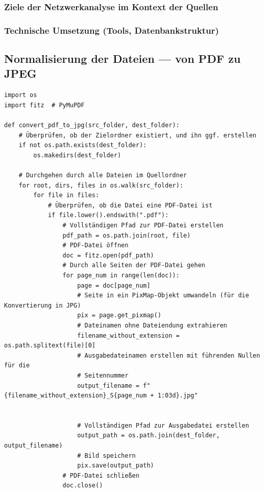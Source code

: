 \documentclass[12pt, a4paper, ngerman, bidi=default]{article}
\begin{document}
        \subsubsection{Ziele der Netzwerkanalyse im Kontext der Quellen}
        \subsubsection{Technische Umsetzung (Tools, Datenbankstruktur)}

\subsection{Normalisierung der Dateien --- von PDF zu JPEG}
\begin{verbatim}
import os
import fitz  # PyMuPDF

def convert_pdf_to_jpg(src_folder, dest_folder):
    # Überprüfen, ob der Zielordner existiert, und ihn ggf. erstellen
    if not os.path.exists(dest_folder):
        os.makedirs(dest_folder)

    # Durchgehen durch alle Dateien im Quellordner
    for root, dirs, files in os.walk(src_folder):
        for file in files:
            # Überprüfen, ob die Datei eine PDF-Datei ist
            if file.lower().endswith(".pdf"):
                # Vollständigen Pfad zur PDF-Datei erstellen
                pdf_path = os.path.join(root, file)
                # PDF-Datei öffnen
                doc = fitz.open(pdf_path)
                # Durch alle Seiten der PDF-Datei gehen
                for page_num in range(len(doc)):
                    page = doc[page_num]
                    # Seite in ein PixMap-Objekt umwandeln (für die Konvertierung in JPG)
                    pix = page.get_pixmap()
                    # Dateinamen ohne Dateiendung extrahieren
                    filename_without_extension = os.path.splitext(file)[0]
                    # Ausgabedateinamen erstellen mit führenden Nullen für die 
                    # Seitennummer
                    output_filename = f"{filename_without_extension}_S{page_num + 1:03d}.jpg"


                    # Vollständigen Pfad zur Ausgabedatei erstellen
                    output_path = os.path.join(dest_folder, output_filename)
                    # Bild speichern
                    pix.save(output_path)
                # PDF-Datei schließen
                doc.close()
                

\end{verbatim}
\end{document}

